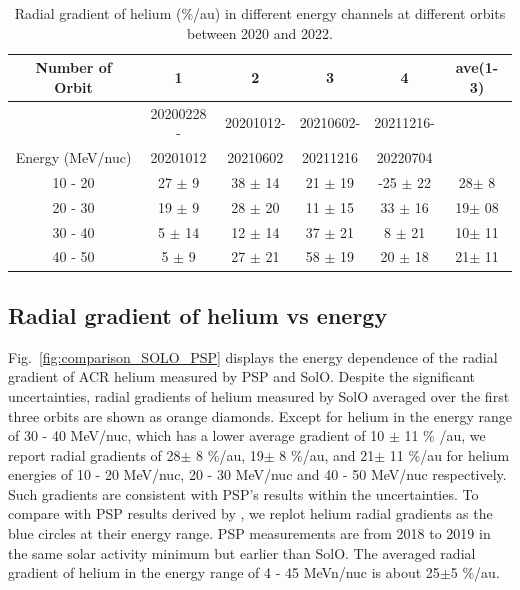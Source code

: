 \begin{table}[!htb]
    \centering
    \begin{tabular}{|c|c|c|c|c|c|}
        \hline
    Number of Orbit     & 1               & 2              & 3               & 4  & ave(1-3)\\
    \hline
                        &20200228 -      & 20201012-        & 20210602-    &  20211216-   &\\  
    Energy (MeV/nuc)    & 20201012        &  20210602       & 20211216      &  20220704  & \\

    \hline
    10 - 20 &  27 $\pm$ 9 & 38 $\pm$ 14 & 21 $\pm$ 19 & -25 $\pm$ 22 & 28$\pm$ 8\\
    \hline
    20 - 30 &  19 $\pm$ 9 & 28 $\pm$ 20 & 11 $\pm$ 15 & 33 $\pm$ 16 & 19$\pm$ 08\\
    \hline
    30 - 40 &  5 $\pm$ 14 & 12 $\pm$ 14 & 37 $\pm$ 21 & 8 $\pm$ 21 & 10$\pm$ 11\\
    \hline
    40 - 50 &  5 $\pm$ 9 & 27 $\pm$ 21 & 58 $\pm$ 19 & 20 $\pm$ 18 & 21$\pm$ 11\\
    \hline
    \end{tabular}
    \caption[Table of helium radial gradient]{Radial gradient of helium (\%/au) in different energy channels at different orbits between 2020 and 2022.}
    \label{Tab:radialgradient_1}
\end{table}
\subsection*{Radial gradient of helium vs energy}

Fig.~\ref{fig:comparison_SOLO_PSP} displays the energy dependence of the radial gradient of \ac{ACR} helium measured by \ac{PSP} and \ac{SolO}. 
Despite the significant uncertainties, radial gradients of helium measured by \ac{SolO} averaged over the first three orbits are shown as orange diamonds. Except for helium in the energy range of 30 - 40 MeV/nuc, which has a lower average gradient of 10 $\pm$ 11 \% /au, we report radial gradients of 28$\pm$ 8 \%/au, 19$\pm$ 8 \%/au, and 21$\pm$ 11 \%/au for helium energies of 10 - 20 MeV/nuc, 20 - 30 MeV/nuc and 40 - 50 MeV/nuc respectively.
Such gradients are consistent with \ac{PSP}'s results within the uncertainties.
To compare with \ac{PSP} results derived by \citet{Rankin2021ApJ}, we replot helium radial gradients as the blue circles at their energy range. \ac{PSP} measurements are from 2018 to 2019 in the same solar activity minimum but earlier than \ac{SolO}. The averaged radial gradient of helium in the energy range of 4 - 45 MeVn/nuc is about 25$\pm$5 \%/au. 



